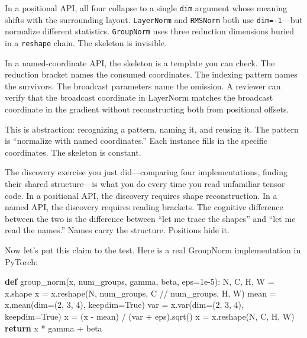 \documentclass[11pt,titlepage]{article}
\newenvironment{Shaded}{}{}
\newcommand{\ControlFlowTok}[1]{\textcolor[rgb]{0.00,0.44,0.13}{\textbf{#1}}}
\newcommand{\DecValTok}[1]{\textcolor[rgb]{0.25,0.63,0.44}{#1}}
\newcommand{\FloatTok}[1]{\textcolor[rgb]{0.25,0.63,0.44}{#1}}
\newcommand{\KeywordTok}[1]{\textcolor[rgb]{0.00,0.44,0.13}{\textbf{#1}}}
\newcommand{\NormalTok}[1]{#1}
\newcommand{\OperatorTok}[1]{\textcolor[rgb]{0.40,0.40,0.40}{#1}}
\newcommand{\VariableTok}[1]{\textcolor[rgb]{0.10,0.09,0.49}{#1}}
\begin{document}
In a positional API, all four collapse to a single \texttt{dim} argument
whose meaning shifts with the surrounding layout. \texttt{LayerNorm} and
\texttt{RMSNorm} both use \texttt{dim=-1}---but normalize different
statistics. \texttt{GroupNorm} uses three reduction dimensions buried in
a \texttt{reshape} chain. The skeleton is invisible.

In a named-coordinate API, the skeleton is a template you can check. The
reduction bracket names the consumed coordinates. The indexing pattern
names the survivors. The broadcast parameters name the omission. A
reviewer can verify that the broadcast coordinate in LayerNorm matches
the broadcast coordinate in the gradient without reconstructing both
from positional offsets.

This is abstraction: recognizing a pattern, naming it, and reusing it.
The pattern is ``normalize with named coordinates.'' Each instance fills
in the specific coordinates. The skeleton is constant.

The discovery exercise you just did---comparing four implementations,
finding their shared structure---is what you do every time you read
unfamiliar tensor code. In a positional API, the discovery requires
shape reconstruction. In a named API, the discovery requires reading
brackets. The cognitive difference between the two is the difference
between ``let me trace the shapes'' and ``let me read the names.'' Names
carry the structure. Positions hide it.

Now let's put this claim to the test. Here is a real GroupNorm
implementation in PyTorch:

\begin{Shaded}
\begin{Highlighting}[]
\KeywordTok{def}\NormalTok{ group_norm(x, num_groups, gamma, beta, eps}\OperatorTok{=}\FloatTok{1e-5}\NormalTok{):}
\NormalTok{    N, C, H, W }\OperatorTok{=}\NormalTok{ x.shape}
\NormalTok{    x }\OperatorTok{=}\NormalTok{ x.reshape(N, num_groups, C }\OperatorTok{//}\NormalTok{ num_groups, H, W)}
\NormalTok{    mean }\OperatorTok{=}\NormalTok{ x.mean(dim}\OperatorTok{=}\NormalTok{(}\DecValTok{2}\NormalTok{, }\DecValTok{3}\NormalTok{, }\DecValTok{4}\NormalTok{), keepdim}\OperatorTok{=}\VariableTok{True}\NormalTok{)}
\NormalTok{    var }\OperatorTok{=}\NormalTok{ x.var(dim}\OperatorTok{=}\NormalTok{(}\DecValTok{2}\NormalTok{, }\DecValTok{3}\NormalTok{, }\DecValTok{4}\NormalTok{), keepdim}\OperatorTok{=}\VariableTok{True}\NormalTok{)}
\NormalTok{    x }\OperatorTok{=}\NormalTok{ (x }\OperatorTok{-}\NormalTok{ mean) }\OperatorTok{/}\NormalTok{ (var }\OperatorTok{+}\NormalTok{ eps).sqrt()}
\NormalTok{    x }\OperatorTok{=}\NormalTok{ x.reshape(N, C, H, W)}
    \ControlFlowTok{return}\NormalTok{ x }\OperatorTok{*}\NormalTok{ gamma }\OperatorTok{+}\NormalTok{ beta}
\end{Highlighting}
\end{Shaded}
\end{document}
